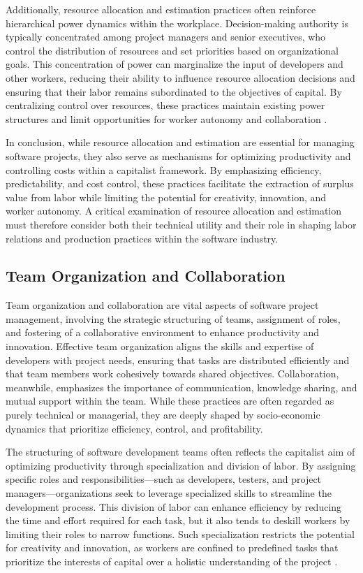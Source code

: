 \begin{refsection}
Additionally, resource allocation and estimation practices often reinforce hierarchical power dynamics within the workplace. Decision-making authority is typically concentrated among project managers and senior executives, who control the distribution of resources and set priorities based on organizational goals. This concentration of power can marginalize the input of developers and other workers, reducing their ability to influence resource allocation decisions and ensuring that their labor remains subordinated to the objectives of capital. By centralizing control over resources, these practices maintain existing power structures and limit opportunities for worker autonomy and collaboration \cite[pp.~54-56]{Taylor2009ScientificManagement}.

In conclusion, while resource allocation and estimation are essential for managing software projects, they also serve as mechanisms for optimizing productivity and controlling costs within a capitalist framework. By emphasizing efficiency, predictability, and cost control, these practices facilitate the extraction of surplus value from labor while limiting the potential for creativity, innovation, and worker autonomy. A critical examination of resource allocation and estimation must therefore consider both their technical utility and their role in shaping labor relations and production practices within the software industry.

\subsection{Team Organization and Collaboration}

Team organization and collaboration are vital aspects of software project management, involving the strategic structuring of teams, assignment of roles, and fostering of a collaborative environment to enhance productivity and innovation. Effective team organization aligns the skills and expertise of developers with project needs, ensuring that tasks are distributed efficiently and that team members work cohesively towards shared objectives. Collaboration, meanwhile, emphasizes the importance of communication, knowledge sharing, and mutual support within the team. While these practices are often regarded as purely technical or managerial, they are deeply shaped by socio-economic dynamics that prioritize efficiency, control, and profitability.

The structuring of software development teams often reflects the capitalist aim of optimizing productivity through specialization and division of labor. By assigning specific roles and responsibilities—such as developers, testers, and project managers—organizations seek to leverage specialized skills to streamline the development process. This division of labor can enhance efficiency by reducing the time and effort required for each task, but it also tends to deskill workers by limiting their roles to narrow functions. Such specialization restricts the potential for creativity and innovation, as workers are confined to predefined tasks that prioritize the interests of capital over a holistic understanding of the project \cite[pp.~67-70]{Dingsoyr2014AgileSoftwareDevelopment}.


\end{refsection}
